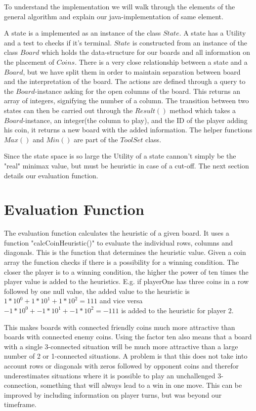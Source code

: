 \documentclass[11pt, a4paper]{article}
\begin{document}
To understand the implementation we will walk through the elements of the general algorithm and explain our java-implementation of same element.

A state is a implemented as an instance of the class $State$. A state has a Utility and a test to checks if it's terminal. $State$ is constructed from an instance of the class $Board$ which holds the data-structure for our boards and all information on the placement of $Coins$. There is a very close relationship between a state and a $Board$, but we have split them in order to maintain separation between board and the interpretation of the board. The actions are defined through a query to the $Board$-instance asking for the open columns of the board. This returns an array of integers, signifying the number of a column. The transition between two states can then be carried out through the $Result()$ method which takes a $Board$-instance, an integer(the column to play), and the ID of the player adding his coin, it returns a new board with the added information. The helper functions $Max()$ and $Min()$ are part of the $ToolSet$ class.

Since the state space is so large the Utility of a state cannon't simply be the "real" minimax value, but must be heuristic in case of a cut-off. The next section details our evaluation function.

\section*{Evaluation Function}

The evaluation function calculates the heuristic of a given board. It uses a function "calcCoinHeuristic()" to evaluate the individual rows, columns and diagonals. This is the function that determines the heuristic value. Given a coin array the function checks if there is a possibility for a winning condition. The closer the player is to a winning condition, the higher the power of ten times the player value is added to the heuristics. E.g. if playerOne has three coins in a row followed by one null value, the added value to the heuristic is $1*10^0+1*10^1+1*10^2 = 111$ and vice versa $-1*10^0+-1*10^1+-1*10^2 = -111$ is added to the heuristic for player 2.

This makes boards with connected friendly coins much more attractive than boards with connected enemy coins. Using the factor ten also means that a board with a single 3-connected situation will be much more attractive than a large number of 2 or 1-connected situations. A problem is that this does not take into account rows or diagonals with zeros followed by opponent coins and therefor underestimates situations where it is possible to play an unchallenged 3-connection, something that will always lead to a win in one move. This can be improved by including information on player turns, but was beyond our timeframe.
\end{document}
